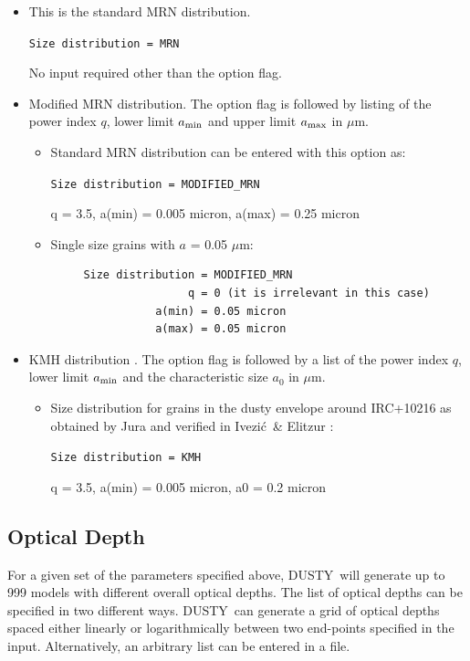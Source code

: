 \documentclass[11pt]{article}
\def\D    {{\sf DUSTY}}
\def\mic    {\hbox{$\mu$m}}
\def\Ivezic {Ivezi\'c}
\begin{document}
\begin{itemize}

\item This is the standard MRN distribution.

  {\tt Size distribution = MRN}

  No input required other than the option flag.

\item Modified MRN distribution.  The option flag is followed by
  listing of the power index $q$, lower limit $a_{\rm min}$ and upper
  limit $a_{\rm max}$ in \mic.

  \begin{itemize}
  \item Standard MRN distribution can be entered with this option as:

    {\tt Size distribution = MODIFIED\_MRN

      q = 3.5, a(min) = 0.005 micron, a(max) = 0.25 micron}

  \item Single size grains with $a$ = 0.05 \mic:

\begin{verbatim}
     Size distribution = MODIFIED_MRN
                     q = 0 (it is irrelevant in this case)
                a(min) = 0.05 micron
                a(max) = 0.05 micron
\end{verbatim}
  \end{itemize}

\item KMH distribution \cite{KMH94}.  The option flag is followed by a
  list of the power index $q$, lower limit $a_{\rm min}$ and the
  characteristic size $a_0$ in \mic.

  \begin{itemize}
  \item Size distribution for grains in the dusty envelope around
    IRC+10216 as obtained by Jura \cite{Jura} and verified in \Ivezic\
    \& Elitzur \cite{IE96b}:

    {\tt Size distribution = KMH

      q = 3.5, a(min) = 0.005 micron, a0 = 0.2 micron}

  \end{itemize}
\end{itemize}


\subsection{Optical Depth}
\label{optical_depth} For a given set of the parameters specified
above, \D\ will generate up to 999 models with different overall
optical depths.  The list of optical depths can be specified in two
different ways.  \D\ can generate a grid of optical depths spaced
either linearly or logarithmically between two end-points specified in
the input.  Alternatively, an arbitrary list can be entered in a file.
\end{document}
